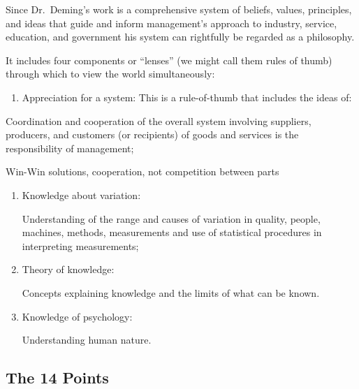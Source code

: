\documentclass[
]{book}
\providecommand{\tightlist}{%
  \setlength{\itemsep}{0pt}\setlength{\parskip}{0pt}}
\begin{document}
Since Dr.~Deming's work is a comprehensive system of beliefs, values, principles, and ideas that guide and inform management's approach to industry, service, education, and government his system can rightfully be regarded as a philosophy.

It includes four components or ``lenses'' (we might call them rules of thumb) through which to view the world simultaneously:

\begin{enumerate}
\def\labelenumi{\arabic{enumi}.}
\tightlist
\item
  Appreciation for a system: This is a rule-of-thumb that includes the ideas of:
\end{enumerate}

Coordination and cooperation of the overall system involving suppliers, producers, and customers (or recipients) of goods and services is the responsibility of management;

Win-Win solutions, cooperation, not competition between parts

\begin{enumerate}
\def\labelenumi{\arabic{enumi}.}
\item
  Knowledge about variation:

  Understanding of the range and causes of variation in quality, people, machines, methods, measurements and use of statistical procedures in interpreting measurements;
\item
  Theory of knowledge:

  Concepts explaining knowledge and the limits of what can be known.
\item
  Knowledge of psychology:

  Understanding human nature.
\end{enumerate}

\hypertarget{the-14-points}{%
\subsection{The 14 Points}\label{the-14-points}}
\end{document}
